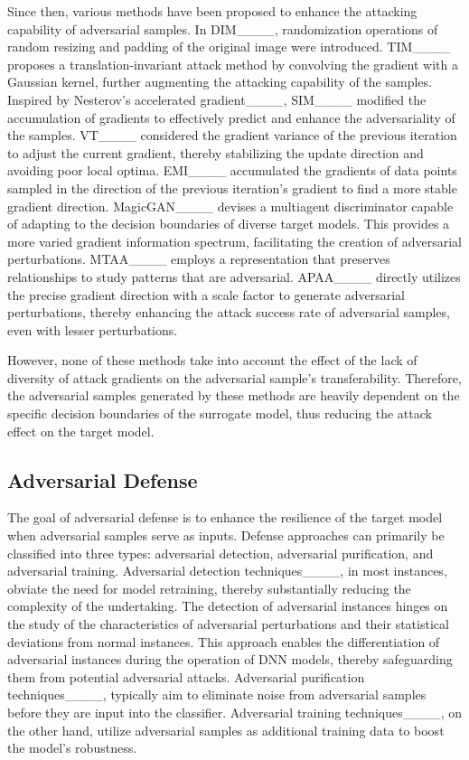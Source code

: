 Since then, various methods have been proposed to enhance the attacking capability of adversarial samples. In DIM____, randomization operations of random resizing and padding of the original image were introduced. TIM____ proposes a translation-invariant attack method by convolving the gradient with a Gaussian kernel, further augmenting the attacking capability of the samples. Inspired by Nesterov's accelerated gradient____, SIM____ modified the accumulation of gradients to effectively predict and enhance the adversariality of the samples. VT____ considered the gradient variance of the previous iteration to adjust the current gradient, thereby stabilizing the update direction and avoiding poor local optima. EMI____ accumulated the gradients of data points sampled in the direction of the previous iteration's gradient to find a more stable gradient direction.
MagicGAN____ devises a multiagent discriminator capable of adapting to the decision boundaries of diverse target models. This provides a more varied gradient information spectrum, facilitating the creation of adversarial perturbations. MTAA____ employs a representation that preserves relationships to study patterns that are adversarial. APAA____ directly utilizes the precise gradient direction with a scale factor to generate adversarial perturbations, thereby enhancing the attack success rate of adversarial samples, even with lesser perturbations.

However, none of these methods take into account the effect of the lack of diversity of attack gradients on the adversarial sample's transferability. Therefore, the adversarial samples generated by these methods are heavily dependent on the specific decision boundaries of the surrogate model, thus reducing the attack effect on the target model.

\subsection{Adversarial Defense}

The goal of adversarial defense is to enhance the resilience of the target model when adversarial samples serve as inputs. Defense approaches can primarily be classified into three types: adversarial detection, adversarial purification, and adversarial training. Adversarial detection techniques____, in most instances, obviate the need for model retraining, thereby substantially reducing the complexity of the undertaking. The detection of adversarial instances hinges on the study of the characteristics of adversarial perturbations and their statistical deviations from normal instances. This approach enables the differentiation of adversarial instances during the operation of DNN models, thereby safeguarding them from potential adversarial attacks. Adversarial purification techniques____, typically aim to eliminate noise from adversarial samples before they are input into the classifier. Adversarial training techniques____, on the other hand, utilize adversarial samples as additional training data to boost the model's robustness.